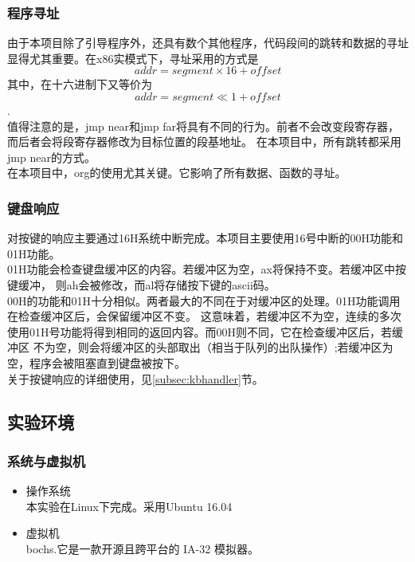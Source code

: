 \documentclass[a4paper]{article}
\newcommand{\codev}[1]{\textsf{#1}}
\begin{document}
    \subsubsection{程序寻址}
    由于本项目除了引导程序外，还具有数个其他程序，代码段间的跳转和数据的寻址显得尤其重要。在x86实模式下，寻址采用的方式是
    $$ addr = segment \times 16 + offset $$
    其中，在十六进制下又等价为 $$addr = segment \ll 1 + offset$$.
    \\
    
    值得注意的是，\codev{jmp near}和\codev{jmp far}将具有不同的行为。前者不会改变段寄存器，而后者会将段寄存器修改为目标位置的段基地址。
    在本项目中，所有跳转都采用\codev{jmp near}的方式。 \\
    
    在本项目中，\codev{org}的使用尤其关键。它影响了所有数据、函数的寻址。
    \subsubsection{键盘响应} \label{subsec:kbhandlerIntro}
    对按键的响应主要通过16H系统中断完成。本项目主要使用16号中断的00H功能和01H功能。\\ 
    
    01H功能会检查键盘缓冲区的内容。若缓冲区为空，ax将保持不变。若缓冲区中按键缓冲，
    则ah会被修改，而al将存储按下键的ascii码。\\
    
    00H的功能和01H十分相似。两者最大的不同在于对缓冲区的处理。01H功能调用在检查缓冲区后，会保留缓冲区不变。
    这意味着，若缓冲区不为空，连续的多次使用01H号功能将得到相同的返回内容。而00H则不同，它在检查缓冲区后，若缓冲区
    不为空，则会将缓冲区的头部取出（相当于队列的出队操作）;若缓冲区为空，程序会被阻塞直到键盘被按下。\\ 

    关于按键响应的详细使用，见\ref{subsec:kbhandler}节。

    \subsection{实验环境}
    \subsubsection{系统与虚拟机}
        \begin{itemize} \item 操作系统 \\ 
            本实验在Linux下完成。采用Ubuntu 16.04
            \item 虚拟机\\
            bochs.它是一款开源且跨平台的 IA-32 模拟器。
        \end{itemize}
\end{document}
